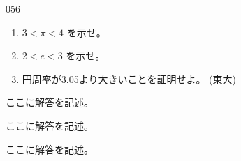 \begin{prob}{056}{}{}
 \begin{enumerate}
  \item $3<\pi<4$ を示せ。
  \item $2<e<3$ を示せ。 
  \item 円周率が3.05より大きいことを証明せよ。  (東大)
 \end{enumerate}
\end{prob}
ここに解答を記述。

ここに解答を記述。

ここに解答を記述。